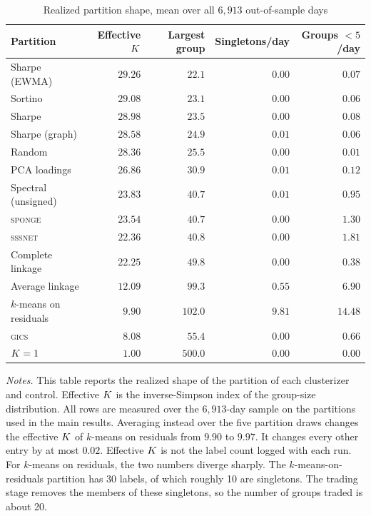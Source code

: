 \begin{table}[htbp]
\centering
\caption{Realized partition shape, mean over all $6{,}913$ out-of-sample days}
\label{tab:sizes}
\begin{threeparttable}
\small
\begin{tabular}{@{}lrrrr@{}}
\toprule
Partition & Effective $K$ & Largest group & Singletons/day & Groups $<5$/day \\
\midrule
Sharpe (EWMA)          & $29.26$ & $22.1$  & $0.00$ & $0.07$ \\
Sortino              & $29.08$ & $23.1$  & $0.00$ & $0.06$ \\
Sharpe               & $28.98$ & $23.5$  & $0.00$ & $0.08$ \\
Sharpe (graph) & $28.58$ & $24.9$ & $0.01$ & $0.06$ \\
Random & $28.36$ & $25.5$  & $0.00$ & $0.01$ \\
PCA loadings & $26.86$ & $30.9$ & $0.01$ & $0.12$ \\
Spectral (unsigned) & $23.83$ & $40.7$ & $0.01$ & $0.95$ \\
\textsc{sponge} & $23.54$ & $40.7$ & $0.00$ & $1.30$ \\
\textsc{sssnet} & $22.36$ & $40.8$ & $0.00$ & $1.81$ \\
Complete linkage & $22.25$ & $49.8$ & $0.00$ & $0.38$ \\
Average linkage & $12.09$ & $99.3$ & $0.55$ & $6.90$ \\
$k$-means on residuals & $9.90$ & $102.0$ & $9.81$ & $14.48$ \\
\textsc{gics} & $8.08$ & $55.4$ & $0.00$ & $0.66$ \\
$K=1$ & $1.00$  & $500.0$ & $0.00$ & $0.00$ \\
\bottomrule
\end{tabular}
\begin{tablenotes}[flushleft]\footnotesize
\item \emph{Notes.} This table reports the realized shape of the partition of each clusterizer and control. Effective $K$ is the inverse-Simpson index of the group-size distribution. All rows are measured over the $6{,}913$-day sample on the partitions used in the main results. Averaging instead over the five partition draws changes the effective $K$ of $k$-means on residuals from $9.90$ to $9.97$. It changes every other entry by at most $0.02$. Effective $K$ is
not the label count logged with each run. For
$k$-means on residuals, the two numbers diverge sharply. The $k$-means-on-residuals partition has $30$ labels, of which roughly 10 are singletons. The trading
stage removes the members of these singletons, so the number of groups traded is about 20.
\end{tablenotes}
\end{threeparttable}
\end{table}

